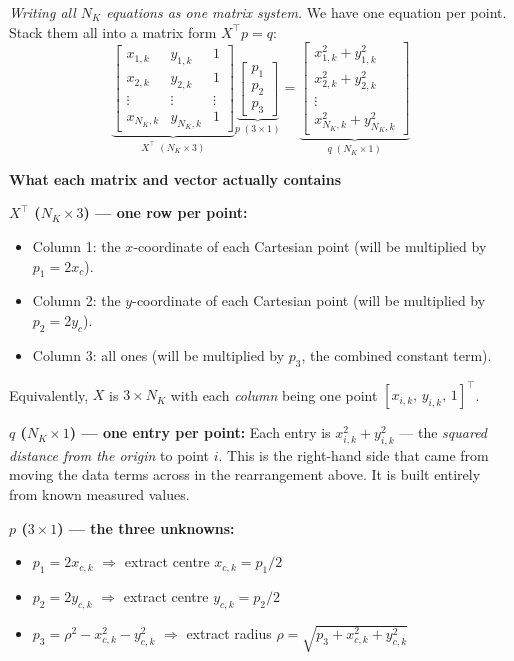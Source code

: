 \documentclass[12pt, a4paper]{article}
\begin{document}
\textit{Writing all $N_K$ equations as one matrix system.}
We have one equation per point.
Stack them all into a matrix form $X^\top p = q$:
\[
  \underbrace{
  \begin{bmatrix}
    x_{1,k} & y_{1,k} & 1 \\
    x_{2,k} & y_{2,k} & 1 \\
    \vdots  & \vdots  & \vdots \\
    x_{N_K,k} & y_{N_K,k} & 1
  \end{bmatrix}
  }_{X^\top \;(N_K \times 3)}
  \underbrace{
  \begin{bmatrix} p_1 \\ p_2 \\ p_3 \end{bmatrix}
  }_{p\;(3\times 1)}
  =
  \underbrace{
  \begin{bmatrix}
    x_{1,k}^2 + y_{1,k}^2 \\
    x_{2,k}^2 + y_{2,k}^2 \\
    \vdots \\
    x_{N_K,k}^2 + y_{N_K,k}^2
  \end{bmatrix}
  }_{q\;(N_K \times 1)}
\]

\begin{notebox}
  \textbf{What each matrix and vector actually contains}

  \medskip
  \textbf{$X^\top$ ($N_K \times 3$) --- one row per point:}
  \begin{itemize}[leftmargin=1.2em,itemsep=2pt]
    \item Column 1: the $x$-coordinate of each Cartesian point
      (will be multiplied by $p_1 = 2x_c$).
    \item Column 2: the $y$-coordinate of each Cartesian point
      (will be multiplied by $p_2 = 2y_c$).
    \item Column 3: all ones (will be multiplied by $p_3$, the
      combined constant term).
  \end{itemize}
  Equivalently, $X$ is $3 \times N_K$ with each \emph{column} being
  one point $[x_{i,k},\, y_{i,k},\, 1]^\top$.

  \medskip
  \textbf{$q$ ($N_K \times 1$) --- one entry per point:}
  Each entry is $x_{i,k}^2 + y_{i,k}^2$ --- the \emph{squared distance
  from the origin} to point $i$.
  This is the right-hand side that came from moving the data terms
  across in the rearrangement above.
  It is built entirely from known measured values.

  \medskip
  \textbf{$p$ ($3 \times 1$) --- the three unknowns:}
  \begin{itemize}[leftmargin=1.2em,itemsep=2pt]
    \item $p_1 = 2x_{c,k}$ \quad$\Rightarrow$ extract centre
      $x_{c,k} = p_1/2$
    \item $p_2 = 2y_{c,k}$ \quad$\Rightarrow$ extract centre
      $y_{c,k} = p_2/2$
    \item $p_3 = \rho^2 - x_{c,k}^2 - y_{c,k}^2$
      \quad$\Rightarrow$ extract radius
      $\rho = \sqrt{p_3 + x_{c,k}^2 + y_{c,k}^2}$
  \end{itemize}
\end{notebox}
\end{document}
